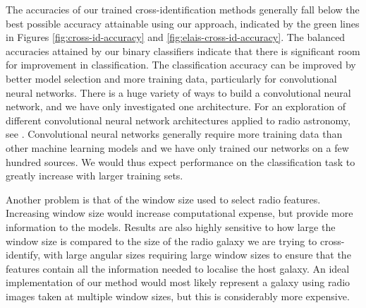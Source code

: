 \documentclass[fleqn,usenatbib,usedcolumn]{mnras}
\begin{document}
  The accuracies of our trained cross-identification methods generally fall
  below the best possible accuracy attainable using our approach, indicated
  by the green lines in Figures \ref{fig:cross-id-accuracy} and
  \ref{fig:elais-cross-id-accuracy}. The balanced accuracies attained by our
  binary classifiers indicate that there is significant room for improvement
  in classification. The classification accuracy can be improved by better
  model selection and more training data, particularly for convolutional
  neural networks. There is a huge variety of ways to build a convolutional
  neural network, and we have only investigated one architecture. For an
  exploration of different convolutional neural network architectures
  applied to radio astronomy, see \citet{lukic17compact}. Convolutional
  neural networks generally require more training data than other machine
  learning models and we have only trained our networks on a few hundred
  sources. We would thus expect performance on the classification task to
  greatly increase with larger training sets.

  Another problem is that of the window size used to select radio features.
  Increasing window size would increase computational expense, but provide
  more information to the models. Results are also highly sensitive to how
  large the window size is compared to the size of the radio galaxy we are
  trying to cross-identify, with large angular sizes requiring large window
  sizes to ensure that the features contain all the information needed to
  localise the host galaxy. An ideal implementation of our method would most
  likely represent a galaxy using radio images taken at multiple window
  sizes, but this is considerably more expensive.
\end{document}
